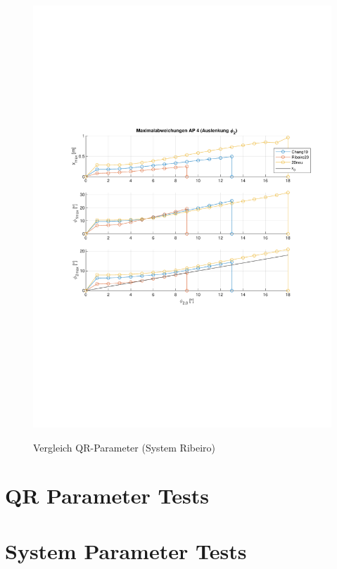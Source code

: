 \begin{figure}
\begin{minipage}[t]{0.45\linewidth}
		\includegraphics[scale=0.47]{Bilder/Parameter neu (Ribeiro) Creg off/AP42.pdf}
		\label{fig:ap3}
	 \end{minipage}
	\caption{Vergleich QR-Parameter (System Ribeiro)}
\end{figure}




\section{QR Parameter Tests}\label{sec:x0qr}



\section{System Parameter Tests}\label{sec:x0sys}



